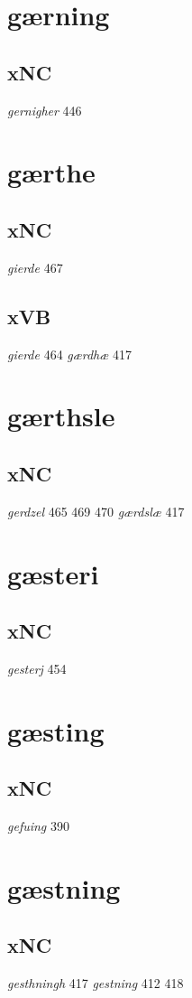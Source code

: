 \documentclass[a4paper,twocolumn]{article}
\begin{document}
\section{gærning}
\label{sec:org8271c0b}
\subsection{xNC}
\label{sec:orgc800163}
\emph{gernigher} 446 
\section{gærthe}
\label{sec:orgc04c4f7}
\subsection{xNC}
\label{sec:orgc5f60a7}
\emph{gierde} 467 
\subsection{xVB}
\label{sec:orgbf5c42c}
\emph{gierde} 464 \emph{gærdhæ} 417 
\section{gærthsle}
\label{sec:org4171ad6}
\subsection{xNC}
\label{sec:org4ac2e62}
\emph{gerdzel} 465 469 470 \emph{gærdslæ} 417 
\section{gæsteri}
\label{sec:orgfa9e856}
\subsection{xNC}
\label{sec:org419b3c2}
\emph{gesterj} 454 
\section{gæsting}
\label{sec:orgd1aacbc}
\subsection{xNC}
\label{sec:org300e8f6}
\emph{gefuing} 390 
\section{gæstning}
\label{sec:org5a7f0b7}
\subsection{xNC}
\label{sec:orgb10b3d0}
\emph{gesthningh} 417 \emph{gestning} 412 418 
\end{document}

